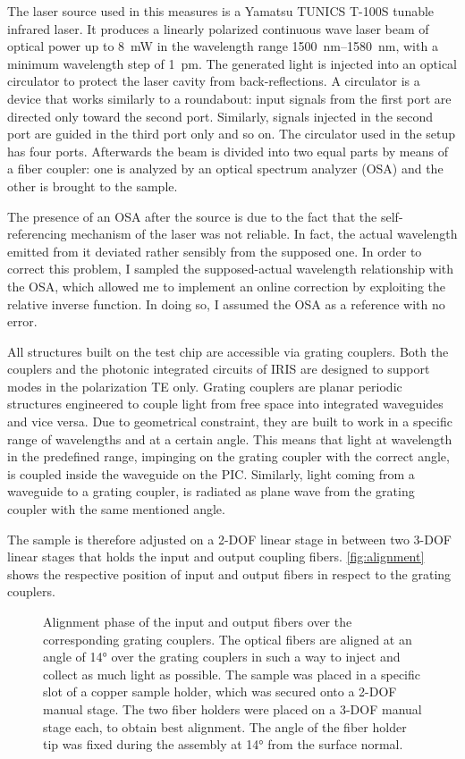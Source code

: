 The laser source used in this measures is a Yamatsu TUNICS T-100S tunable infrared laser.
It produces a linearly polarized continuous wave laser beam of optical power up to \SI{8}{\mW} in the wavelength range \SIrange{1500}{1580}{\nm}, with a minimum wavelength step of \SI{1}{\pm}.
The generated light is injected into an optical circulator to protect the laser cavity from back-reflections.
A circulator is a device that works similarly to a roundabout: input signals from the first port are directed only toward the second port. Similarly, signals injected in the second port are guided in the third port only and so on.
The circulator used in the setup has four ports.
Afterwards the beam is divided into two equal parts by means of a fiber coupler: one is analyzed by an optical spectrum analyzer (OSA) and the other is brought to the sample.

The presence of an OSA after the source is due to the fact that the self-referencing mechanism of the laser was not reliable.
In fact, the actual wavelength emitted from it deviated rather sensibly from the supposed one.
In order to correct this problem, I sampled the supposed-actual wavelength relationship with the OSA, which allowed me to implement an online correction by exploiting the relative inverse function.
In doing so, I assumed the OSA as a reference with no error.

All structures built on the test chip are accessible via grating couplers.
Both the couplers and the photonic integrated circuits of IRIS are designed to support modes in the polarization TE only.
Grating couplers are planar periodic structures engineered to couple light from free space into integrated waveguides and vice versa.
Due to geometrical constraint, they are built to work in a specific range of wavelengths and at a certain angle.
This means that light at wavelength in the predefined range, impinging on the grating coupler with the correct angle, is coupled inside the waveguide on the PIC.
Similarly, light coming from a waveguide to a grating coupler, is radiated as plane wave from the grating coupler with the same mentioned angle.

The sample is therefore adjusted on a 2-DOF linear stage in between two 3-DOF linear stages that holds the input and output coupling fibers.
\autoref{fig:alignment} shows the respective position of input and output fibers in respect to the grating couplers.

\begin{figure}[htbp]
	\centering
	
	\caption{Alignment phase of the input and output fibers over the corresponding grating couplers.
	The optical fibers are aligned at an angle of \ang{14} over the grating couplers in such a way to inject and collect as much light as possible.
	The sample was placed in a specific slot of a copper sample holder, which was secured onto a 2-DOF manual stage.
	The two fiber holders were placed on a 3-DOF manual stage each, to obtain best alignment.
	The angle of the fiber holder tip was fixed during the assembly at \ang{14} from the surface normal.}
	\label{fig:alignment}
\end{figure}

